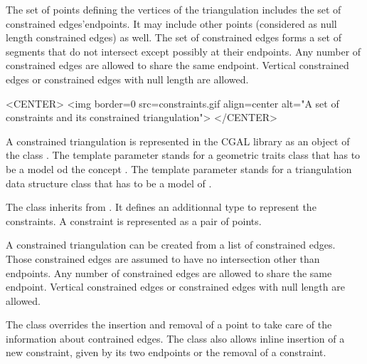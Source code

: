 The set of points defining the vertices of the triangulation
includes the set of constrained edges'endpoints. It may include other points
(considered as null length constrained edges) as well.  The set of
constrained edges forms a set of segments that do not intersect
except possibly at their endpoints.  Any number of constrained edges
are allowed to share the same endpoint.  Vertical constrained edges or
constrained edges with null length are allowed.

\begin{ccTexOnly}
\begin{center}   \end{center}
\end{ccTexOnly}
 
\begin{ccHtmlOnly}
<CENTER>
<img border=0 src=constraints.gif align=center alt="A set of
constraints and its constrained triangulation">
</CENTER>
\end{ccHtmlOnly}

A constrained triangulation is represented in the CGAL library as an
object of the class .
The template parameter  
stands for a geometric traits class  that has to be a model
od the concept .
The template parameter 
stands for 
a triangulation data structure class that has to be a model
of .

The class 
inherits from .
It defines an additionnal type 
to represent the constraints. A
constraint is represented as a pair of points.

A  constrained triangulation can be created
from a
list of constrained edges. Those constrained edges are assumed to have no
intersection other than endpoints. Any number of constrained edges are
allowed to share the same endpoint.  Vertical constrained edges or
constrained edges with null length are allowed.

The class 
overrides the insertion and removal of a point to take care of the
information about contrained edges. The class also allows inline
insertion of a new constraint, given by its two endpoints
or the removal of a constraint.

